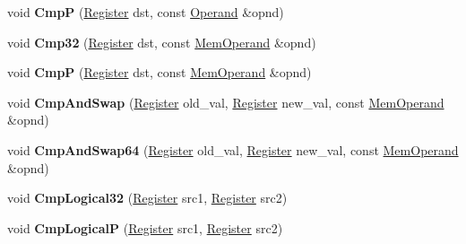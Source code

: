 \begin{DoxyCompactItemize}
void {\bfseries CmpP} (\mbox{\hyperlink{classv8_1_1internal_1_1Register}{Register}} dst, const \mbox{\hyperlink{classv8_1_1internal_1_1Operand}{Operand}} \&opnd)
\item 
\mbox{\label{classv8_1_1internal_1_1TurboAssembler_a897c574b5928954007288a56d298346e}} 
void {\bfseries Cmp32} (\mbox{\hyperlink{classv8_1_1internal_1_1Register}{Register}} dst, const \mbox{\hyperlink{classv8_1_1internal_1_1MemOperand}{Mem\+Operand}} \&opnd)
\item 
\mbox{\label{classv8_1_1internal_1_1TurboAssembler_a0f20c301cb05f60313f246bafdc4ca5c}} 
void {\bfseries CmpP} (\mbox{\hyperlink{classv8_1_1internal_1_1Register}{Register}} dst, const \mbox{\hyperlink{classv8_1_1internal_1_1MemOperand}{Mem\+Operand}} \&opnd)
\item 
\mbox{\label{classv8_1_1internal_1_1TurboAssembler_a24414a1afdaabb3c26f630486812d2e4}} 
void {\bfseries Cmp\+And\+Swap} (\mbox{\hyperlink{classv8_1_1internal_1_1Register}{Register}} old\+\_\+val, \mbox{\hyperlink{classv8_1_1internal_1_1Register}{Register}} new\+\_\+val, const \mbox{\hyperlink{classv8_1_1internal_1_1MemOperand}{Mem\+Operand}} \&opnd)
\item 
\mbox{\label{classv8_1_1internal_1_1TurboAssembler_aab4fbb8dabb391da9ea301084cbf7d7d}} 
void {\bfseries Cmp\+And\+Swap64} (\mbox{\hyperlink{classv8_1_1internal_1_1Register}{Register}} old\+\_\+val, \mbox{\hyperlink{classv8_1_1internal_1_1Register}{Register}} new\+\_\+val, const \mbox{\hyperlink{classv8_1_1internal_1_1MemOperand}{Mem\+Operand}} \&opnd)
\item 
\mbox{\label{classv8_1_1internal_1_1TurboAssembler_ac0a8ead8689b2068ae393f118d9e6771}} 
void {\bfseries Cmp\+Logical32} (\mbox{\hyperlink{classv8_1_1internal_1_1Register}{Register}} src1, \mbox{\hyperlink{classv8_1_1internal_1_1Register}{Register}} src2)
\item 
\mbox{\label{classv8_1_1internal_1_1TurboAssembler_a632f5acacaf32676c4d402e74190da02}} 
void {\bfseries Cmp\+LogicalP} (\mbox{\hyperlink{classv8_1_1internal_1_1Register}{Register}} src1, \mbox{\hyperlink{classv8_1_1internal_1_1Register}{Register}} src2)

\end{DoxyCompactItemize}
